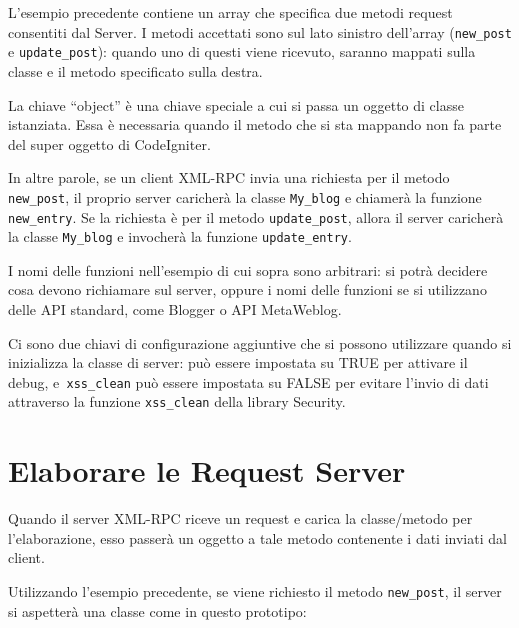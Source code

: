 
L'esempio precedente contiene un array che specifica due metodi request consentiti dal Server. I metodi accettati sono sul lato sinistro dell'array (\verb|new_post| e \verb|update_post|): quando uno di questi viene ricevuto, saranno mappati sulla classe e il metodo specificato sulla destra.

La chiave ``object'' è una chiave speciale a cui si passa un oggetto di classe istanziata. Essa è necessaria quando il metodo che si sta mappando non fa parte del super oggetto di CodeIgniter.

In altre parole, se un client XML-RPC invia una richiesta per il metodo \verb|new_post|, il proprio server caricherà la classe \verb|My_blog| e chiamerà la funzione \verb|new_entry|. Se la richiesta è per il metodo \verb|update_post|, allora il server caricherà la classe \verb|My_blog| e invocherà la funzione \verb|update_entry|.

I nomi delle funzioni nell'esempio di cui sopra sono arbitrari: si potrà decidere cosa devono richiamare sul server, oppure i nomi delle funzioni se si utilizzano delle API standard, come  Blogger o API MetaWeblog.

Ci sono due chiavi di configurazione aggiuntive che si possono utilizzare quando si inizializza la classe di server:  può essere impostata su TRUE per attivare il debug, e\verb| xss_clean| può essere impostata su FALSE per evitare l'invio di dati attraverso la funzione \verb|xss_clean| della library Security.

\section*{Elaborare le Request Server}

Quando il server XML-RPC riceve un request e carica la classe/metodo per l'elaborazione, esso passerà un oggetto a tale metodo contenente i dati inviati dal client.

Utilizzando l'esempio precedente, se viene richiesto il metodo \verb|new_post|, il server si aspetterà una classe come in questo prototipo:

